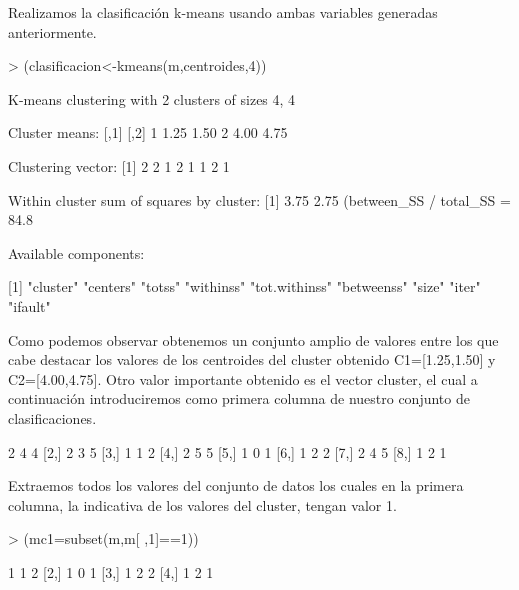 \documentclass[a4paper]{article}
\begin{document}
Realizamos la clasificación k-means usando ambas variables generadas anteriormente.
\begin{Schunk}
\begin{Sinput}
> (clasificacion<-kmeans(m,centroides,4))
\end{Sinput}
\begin{Soutput}
K-means clustering with 2 clusters of sizes 4, 4

Cluster means:
  [,1] [,2]
1 1.25 1.50
2 4.00 4.75

Clustering vector:
[1] 2 2 1 2 1 1 2 1

Within cluster sum of squares by cluster:
[1] 3.75 2.75
 (between_SS / total_SS =  84.8 %

Available components:

[1] "cluster"      "centers"      "totss"        "withinss"     "tot.withinss" "betweenss"    "size"         "iter"         "ifault"      
\end{Soutput}
\end{Schunk}

Como podemos observar obtenemos un conjunto amplio de valores entre los que cabe destacar los valores de los centroides del cluster obtenido C1=[1.25,1.50] y C2=[4.00,4.75]. Otro valor importante obtenido es el vector cluster, el cual a continuación introduciremos como primera columna de nuestro conjunto de clasificaciones.
\begin{Schunk}
\begin{Soutput}
     [,1] [,2] [,3]
[1,]    2    4    4
[2,]    2    3    5
[3,]    1    1    2
[4,]    2    5    5
[5,]    1    0    1
[6,]    1    2    2
[7,]    2    4    5
[8,]    1    2    1
\end{Soutput}
\end{Schunk}

Extraemos todos los valores del conjunto de datos los cuales en la primera columna, la indicativa de los valores del cluster, tengan valor 1.
\begin{Schunk}
\begin{Sinput}
> (mc1=subset(m,m[ ,1]==1)) 
\end{Sinput}
\begin{Soutput}
     [,1] [,2] [,3]
[1,]    1    1    2
[2,]    1    0    1
[3,]    1    2    2
[4,]    1    2    1
\end{Soutput}
\end{Schunk}
\end{document}
